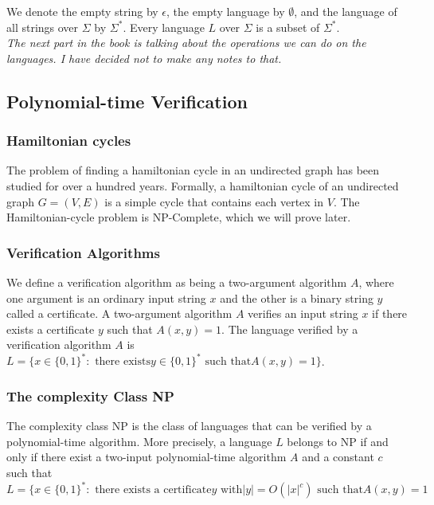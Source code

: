 We denote the empty string by $\epsilon$, the empty language by $\emptyset$, and the language of all strings over $\Sigma$ by $\Sigma^*$. Every language $L$ over $\Sigma$ is a subset of $\Sigma^*$. \\

\textit{The next part in the book is talking about the operations we can do on the languages. I have decided not to make any notes to that. }

\subsection{Polynomial-time Verification}
\subsubsection{Hamiltonian cycles}
The problem of finding a hamiltonian cycle in an undirected graph has been studied for over a hundred years. Formally, a hamiltonian cycle of an undirected graph $G = (V, E)$ is a simple cycle that contains each vertex in $V$. The Hamiltonian-cycle problem is NP-Complete, which we will prove later. 

\subsubsection{Verification Algorithms}
We define a verification algorithm as being a two-argument algorithm $A$, where one argument is an ordinary input string $x$ and the other is a binary string $y$ called a certificate. A two-argument algorithm $A$ verifies an input string $x$ if there exists a certificate $y$ such that $A(x, y) = 1$. The language verified by a verification algorithm $A$ is\\
$L = \{x \in \{0, 1\}^* :\text{ there exists} y \in \{0, 1\}^* \text{ such that} A(x, y) = 1 \}$.

\subsubsection{The complexity Class NP}
The complexity class NP is the class of languages that can be verified by a polynomial-time algorithm. More precisely, a language $L$ belongs to NP if and only if there exist a two-input polynomial-time algorithm $A$ and a constant $c$ such that\\

$ L = \{x \in \{0, 1\}^* : \text{ there exists a certificate} y \text{ with} |y| = O(|x|^c) \text{ such that} A(x, y) = 1$\\

